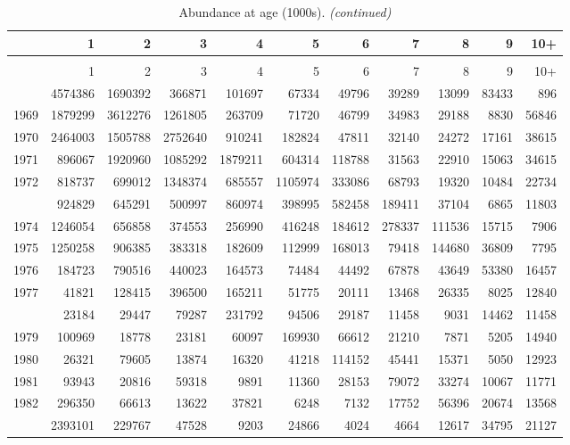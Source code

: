\documentclass[
]{article}
\begin{document}
\begin{longtable}[t]{lrrrrrrrrrr}
\caption{\label{tab:NAA-table}Abundance at age (1000s).}\\
\toprule
  & 1 & 2 & 3 & 4 & 5 & 6 & 7 & 8 & 9 & 10+\\
\midrule
\endfirsthead
\caption[]{Abundance at age (1000s). \textit{(continued)}}\\
\toprule
  & 1 & 2 & 3 & 4 & 5 & 6 & 7 & 8 & 9 & 10+\\
\midrule
\endhead

\endfoot
\bottomrule
\endlastfoot
1968 & 4574386 & 1690392 & 366871 & 101697 & 67334 & 49796 & 39289 & 13099 & 83433 & 896\\
1969 & 1879299 & 3612276 & 1261805 & 263709 & 71720 & 46799 & 34983 & 29188 & 8830 & 56846\\
1970 & 2464003 & 1505788 & 2752640 & 910241 & 182824 & 47811 & 32140 & 24272 & 17161 & 38615\\
1971 & 896067 & 1920960 & 1085292 & 1879211 & 604314 & 118788 & 31563 & 22910 & 15063 & 34615\\
1972 & 818737 & 699012 & 1348374 & 685557 & 1105974 & 333086 & 68793 & 19320 & 10484 & 22734\\
\addlinespace
1973 & 924829 & 645291 & 500997 & 860974 & 398995 & 582458 & 189411 & 37104 & 6865 & 11803\\
1974 & 1246054 & 656858 & 374553 & 256990 & 416248 & 184612 & 278337 & 111536 & 15715 & 7906\\
1975 & 1250258 & 906385 & 383318 & 182609 & 112999 & 168013 & 79418 & 144680 & 36809 & 7795\\
1976 & 184723 & 790516 & 440023 & 164573 & 74484 & 44492 & 67878 & 43649 & 53380 & 16457\\
1977 & 41821 & 128415 & 396500 & 165211 & 51775 & 20111 & 13468 & 26335 & 8025 & 12840\\
\addlinespace
1978 & 23184 & 29447 & 79287 & 231792 & 94506 & 29187 & 11458 & 9031 & 14462 & 11458\\
1979 & 100969 & 18778 & 23181 & 60097 & 169930 & 66612 & 21210 & 7871 & 5205 & 14940\\
1980 & 26321 & 79605 & 13874 & 16320 & 41218 & 114152 & 45441 & 15371 & 5050 & 12923\\
1981 & 93943 & 20816 & 59318 & 9891 & 11360 & 28153 & 79072 & 33274 & 10067 & 11771\\
1982 & 296350 & 66613 & 13622 & 37821 & 6248 & 7132 & 17752 & 56396 & 20674 & 13568\\
\addlinespace
1983 & 2393101 & 229767 & 47528 & 9203 & 24866 & 4024 & 4664 & 12617 & 34795 & 21127\\

\end{longtable}
\end{document}
